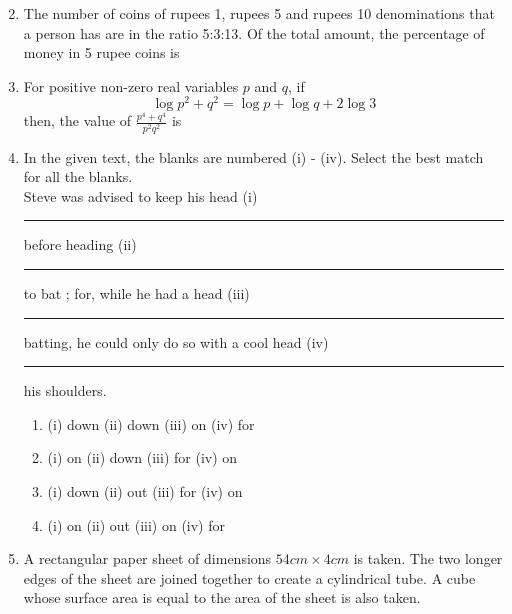 \documentclass[journal]{IEEEtran}
\begin{document}
\begin{enumerate}
\begin{enumerate}
\begin{multicols}{4}
				\end{multicols}
		\end{enumerate}
	\item The number of coins of rupees 1, rupees 5 and rupees 10 denominations that a person has are in the ratio 5:3:13. Of the total amount, the percentage of money in 5 rupee coins is
		\begin{enumerate}
		\end{enumerate}
	\item For positive non-zero real variables $p$ and $q$, if 
		$$ \log{p^2 + q^2} = \log{p} + \log{q} + 2 \log{3} $$
		then, the value of $\frac{p^4 + q^4}{p^2 q^2}$ is
		\begin{enumerate}
				\begin{multicols}{4}
				\item 79
				\item 81
				\item 9
				\item 83
				\end{multicols}
		\end{enumerate}
	\item In the given text, the blanks are numbered (i) - (iv). Select the best match for all the blanks. \\
		Steve was advised to keep his head (i) \rule{1cm}{0.1pt} before heading (ii) \rule{1cm}{0.1pt} to bat ; for, while he had a head (iii) \rule{1cm}{0.1pt} batting, he could only do so with a cool head (iv) \rule{1cm}{0.1pt} his shoulders.
		\begin{enumerate}
			\item (i) down (ii) down (iii) on (iv) for
			\item (i) on (ii) down (iii) for (iv) on
			\item (i) down (ii) out (iii) for (iv) on
			\item (i) on (ii) out (iii) on (iv) for
		\end{enumerate}
	\item A rectangular paper sheet of dimensions $ 54 cm \times 4 cm$ is taken. The two longer edges of the sheet are joined together to create a cylindrical tube. A cube whose surface area is equal to the area of the sheet is also taken. \\

\end{enumerate}
\end{document}
